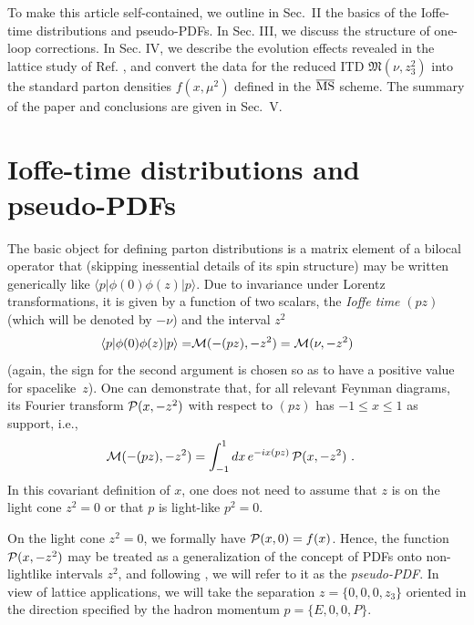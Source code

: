 \documentclass[aps,prd,twocolumn,showpacs,preprintnumbers,superscriptaddress]{revtex4-1}
\begin{document}
 
 To make this article  self-contained, we outline  in \mbox{Sec. II} 
 the basics of  the Ioffe-time distributions and pseudo-PDFs. 
 In Sec.  III, we discuss the structure of  one-loop corrections. 
 In Sec.  IV, we  describe the evolution effects 
 revealed  in the lattice study of Ref. \cite{Orginos:2017kos},
 and convert the data for  the reduced ITD ${\mathfrak M} (\nu, z_3^2)$
 into the standard parton densities $f(x,\mu^2)$ defined in the $\overline{\rm MS}$  scheme. 
 The summary of the paper and conclusions  are  given in \mbox{Sec.  V.}
 

 
  
 
 
 
 \section{Ioffe-time  distributions and pseudo-PDFs} 



 The basic object for defining parton distributions is a matrix element 
 of a bilocal operator that  (skipping inessential details of  its 
 spin structure)   may be written   generically  like 
 $\langle  p | \phi (0)  \phi(z)  | p \rangle $. 
Due to invariance under Lorentz transformations, it is given by a function of two scalars,  
the  {\it Ioffe time}   $(pz)$  \cite{Ioffe:1969kf}  
(which will  be denoted by $-\nu$)  and  the interval  $z^2$
  \begin{align}
  \langle p |   \phi(0) \phi (z)|p \rangle 
=  & {\cal M} (-(pz), -z^2)  =  {\cal M} (\nu, -z^2)  
\,  
 \
 \label{lorentz}
\end{align} 
 (again, the sign for the second argument   is   chosen  so as to have  
  a positive value  for \mbox{spacelike $z$)}.
 One can demonstrate \cite{Radyushkin:2016hsy,Radyushkin:1983wh}    that, for all relevant Feynman diagrams,   
 its  Fourier transform  ${\cal P} (x, -z^2)$ with respect to $(pz)$ 
 has $-1 \leq x \leq 1$ as support, i.e., 
   \begin{align}
 {\cal M} (-(pz), -z^2) 
&   = 
 \int_{-1}^1 dx 
 \, e^{-i x (pz) } \,  {\cal P} (x, -z^2)  \   .
  \label{MPD}
\end{align}   
   In this  covariant  definition of  $x$,  one does not need to assume that  
   $z$ is on the light cone
$z^2=0$ or that $p$   is light-like $p^2=0$.
  
  On the light cone $z^2=0$, we formally have 
 \mbox{$   {\cal P} (x, 0) =f(x) $.}  Hence, the function $ {\cal P} (x, -z^2) $ 
 may be treated as   a generalization of the concept of 
PDFs onto non-lightlike intervals $z^2$, and  following   \cite{Radyushkin:2017cyf} ,  we will  refer to it as the
 {\it pseudo-PDF}.  In view of lattice applications, we will take the separation 
$z=\{0,0,0,z_3\}$ oriented  in the direction specified by the hadron momentum $p=\{E,0,0,P\}$.
  
\end{document}
